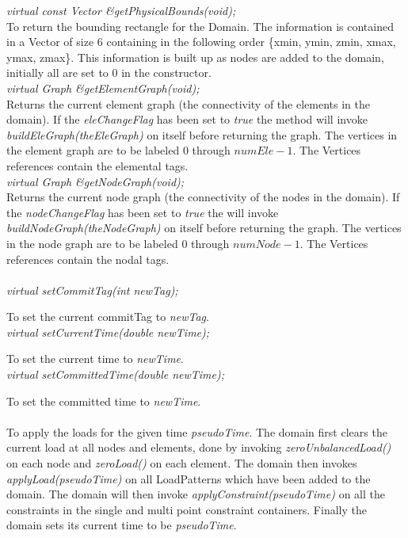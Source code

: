 {\em virtual const Vector \&getPhysicalBounds(void);} \\
To return the bounding rectangle for the Domain. The information is
contained in a Vector of size 6 containing in the following order
\{xmin, ymin, zmin, xmax, ymax, zmax\}. This information is built up
as nodes are added to the domain, initially all are set to $0$ in the
constructor. \\

{\em virtual Graph \&getElementGraph(void);} \\
Returns the current element graph (the connectivity of the elements
in the domain). If the {\em eleChangeFlag} has been set
to {\em true} the method will invoke {\em buildEleGraph(theEleGraph)}
on itself before returning the graph. The vertices in the element
graph are to be labeled $0$ through $numEle-1$. The Vertices references
contain the elemental tags. \\ 

{\em virtual Graph \&getNodeGraph(void);} \\
Returns the current node graph (the connectivity of the nodes in
the domain). If the {\em nodeChangeFlag} has been set to {\em true} the
will invoke {\em buildNodeGraph(theNodeGraph)} on itself before
returning the graph. The vertices in the node graph are to be labeled
$0$ through $numNode-1$. The Vertices references contain the nodal tags. \\ 


  \\
{\em virtual setCommitTag(int newTag);} 

To set the current commitTag to {\em newTag}. \\

{\em virtual setCurrentTime(double newTime);} 

To set the current time to {\em newTime}. \\

{\em virtual setCommittedTime(double newTime);} 

To set the committed time to {\em newTime}. \\

 \\ 
To apply the loads for the given time {\em pseudoTime}. The domain
first clears the current load at all nodes and elements, done by
invoking {\em zeroUnbalancedLoad()} on each node and {\em zeroLoad()}
on each element. The domain then invokes {\em applyLoad(pseudoTime)}
on all LoadPatterns which have been added to the domain. The domain
will then invoke {\em applyConstraint(pseudoTime)} on all the
constraints in the single and multi point constraint
containers. Finally the domain sets its current time to be {\em
pseudoTime}.\\  

